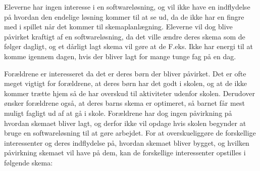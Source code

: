 Eleverne har ingen interesse i en softwareløsning, og vil ikke have en indflydelse på hvordan den endelige løsning kommer til at se ud, da de ikke har en fingre med i spillet når det kommer til skemaplanlægning. Eleverne vil dog blive påvirket kraftigt af en softwareløsning, da det ville ændre deres skema som de følger dagligt, og et dårligt lagt skema vil gøre at de F.eks. Ikke har energi til at komme igennem dagen, hvis der bliver lagt for mange tunge fag på en dag.

Forældrene er interesseret da det er deres børn der bliver påvirket. Det er ofte meget vigtigt for forældrene, at deres børn har det godt i skolen, og at de ikke kommer trætte hjem så de har overskud til aktiviteter udenfor skolen. Derudover ønsker forældrene også, at deres barns skema er optimeret, så barnet får mest muligt fagligt ud af at gå i skole. Forældrene har dog ingen påvirkning på hvordan skemaet bliver lagt, og derfor ikke vil opdage hvis skolen begynder at bruge en softwareløsning til at gøre arbejdet.
For at overskueliggøre de forskellige interessenter og deres indflydelse på, hvordan skemaet bliver bygget, og hvilken påvirkning skemaet vil have på dem, kan de forskellige interessenter opstilles i følgende skema:
